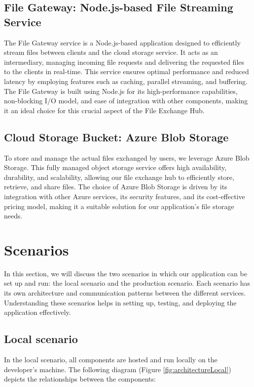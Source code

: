 \documentclass[a4paper,fleqn]{cas-dc}
\begin{document}
\subsection{File Gateway: Node.js-based File Streaming Service}

The File Gateway service is a Node.js-based application designed to efficiently stream files between clients and the cloud storage service. It acts as an intermediary, managing incoming file requests and delivering the requested files to the clients in real-time. This service ensures optimal performance and reduced latency by employing features such as caching, parallel streaming, and buffering. The File Gateway is built using Node.js for its high-performance capabilities, non-blocking I/O model, and ease of integration with other components, making it an ideal choice for this crucial aspect of the File Exchange Hub.

\subsection{Cloud Storage Bucket: Azure Blob Storage}

To store and manage the actual files exchanged by users, we leverage Azure Blob Storage. This fully managed object storage service offers high availability, durability, and scalability, allowing our file exchange hub to efficiently store, retrieve, and share files. The choice of Azure Blob Storage is driven by its integration with other Azure services, its security features, and its cost-effective pricing model, making it a suitable solution for our application's file storage needs.

\section{Scenarios} \label{sec:scenarios}

In this section, we will discuss the two scenarios in which our application can be set up and run: the local scenario and the production scenario. Each scenario has its own architecture and communication patterns between the different services. Understanding these scenarios helps in setting up, testing, and deploying the application effectively.

\subsection{Local scenario}

In the local scenario, all components are hosted and run locally on the developer's machine. The following diagram (Figure \ref{fig:architectureLocal}) depicts the relationships between the components:
\end{document}
